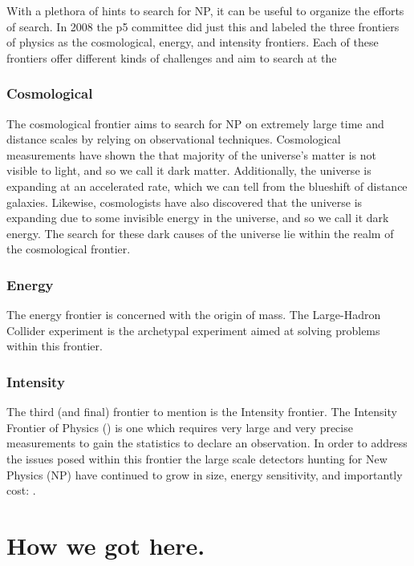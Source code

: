 With a plethora of hints to search for NP, it can be useful to organize the efforts of search.
In 2008 the p5 committee did just this and labeled the three frontiers of physics as the cosmological, energy, and intensity frontiers.
Each of these frontiers offer different kinds of challenges and aim to search at the

\subsubsection{Cosmological}
The cosmological frontier aims to search for NP on extremely large time and distance scales by relying on observational techniques.
Cosmological measurements have shown the that majority of the universe's matter is not visible to light, and so we call it dark matter.
Additionally, the universe is expanding at an accelerated rate, which we can tell from the blueshift of distance galaxies.
Likewise, cosmologists have also discovered that the universe is expanding due to some invisible energy in the universe, and so we call it dark energy.
The search for these dark causes of the universe lie within the realm of the cosmological frontier.

\subsubsection{Energy}
The energy frontier is concerned with the origin of mass.
The Large-Hadron Collider experiment is the archetypal experiment aimed at solving problems within this frontier.

\subsubsection{Intensity}
The third (and final) frontier to mention is the Intensity frontier.
The Intensity Frontier of Physics (\citep{intensityfrontier2012_Hewett}) is one which requires very large and very precise measurements to gain the statistics to declare an observation.
In order to address the issues posed within this frontier the large scale detectors hunting for New Physics (NP) have continued to grow in size, energy sensitivity, and importantly cost: \citep{Juno:2022103927}.


\section{How we got here.}

